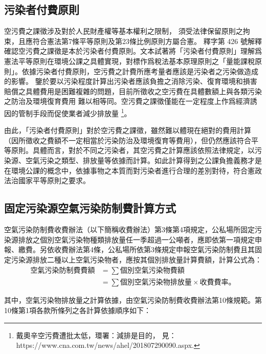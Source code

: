 \documentclass[11pt,a4paper]{article}
\begin{document}
\subsection{污染者付費原則}
空污費之課徵涉及對於人民財產權等基本權利之限制，
須受法律保留原則之拘束，且應符合憲法第7條平等原則及第23條比例原則方屬合憲。
釋字第 426 號解釋確認空污費之課徵是本於污染者付費原則。文本試著將「污染者付費原則」理解爲憲法平等原則在環境公課之具體實現，對標作爲稅法基本原理原則之「量能課稅原則」。依據污染者付費原則，空污費之計費所應考量者應該是污染者之污染做造成的影響。
鑒於要以污染程度計算出污染者應該負擔之消除污染、復育環境和損害賠償之具體費用是困難複雜的問題，目前所徵收之空污費在具體數額上與各類污染之防治及環境復育費用
難以相等同。空污費之課徵僅能在一定程度上作爲經濟誘因的管制手段而促使業者減少排放量
\footnote{戴奧辛空污費遭批太低，環署：減排是目的，
見：https://www.cna.com.tw/news/ahel/201807290090.aspx.}。

由此，「污染者付費原則」對於空污費之課徵，雖然難以體現在絕對的費用計算（因所徵收之費額不一定相當於污染防治及環境復育等費用），但仍然應該符合平等原則。具體而言，對於不同之污染者，其空污費之計算應該依照法律規定，以污染源、空氣污染之類型、排放量等依據而計算。如此計算得到之公課負擔義務才是在環境公課的概念中，依據事物之本質而對污染者進行合理的差別對待，符合憲政法治國家平等原則之要求。



\subsection{固定污染源空氣污染防制費計算方式}
空氣污染防制費收費辦法（以下簡稱收費辦法）第3條第4項規定，公私場所固定污染源排放之個別空氣污染物種類排放量任一季超過一公噸者，應即依第一項規定申報、繳費。另依收費辦法第4條，公私場所依第3條規定申報空氣污染防制費且其固定污染源排放二種以上空氣污染物者，應按其個別排放量計算費額，計算公式為：
\begin{equation*}
   \begin{aligned}
     \text{空氣污染防制費費額}&=\sum \text{個別空氣污染物費額}\\
     &=\sum\text{個別空氣污染物排放量}\times \text{收費費率。}
   \end{aligned}
 \end{equation*}


其中，空氣污染物排放量之計算依據，由空氣污染防制費收費辦法第10條規範。第10條第1項各款所條列之各計算依據順序如下：
\end{document}
